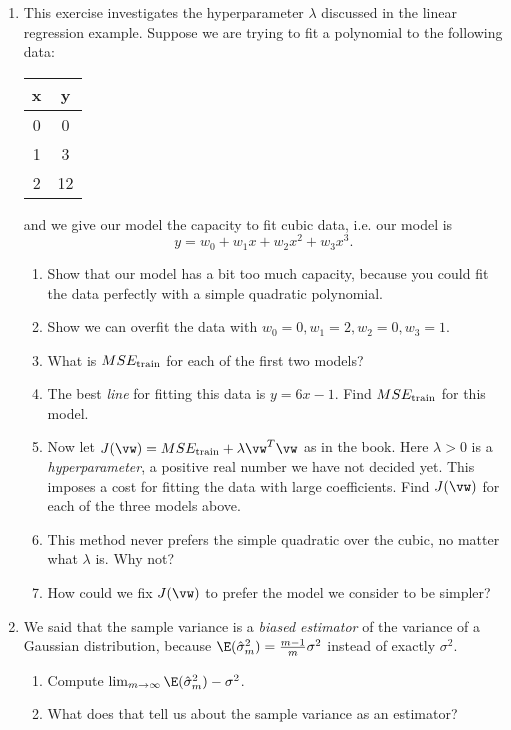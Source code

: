 \documentclass{article}
\newcommand{\strain}{_{\textnormal{train}}}
\begin{document}
\begin{enumerate}
\item This exercise investigates the hyperparameter $\lambda$ discussed in the linear regression example. Suppose we are trying to fit a polynomial to the following data:

    \begin{tabular}{c|c}
    x & y \\
    \hline
    0 & 0 \\
    1 & 3 \\
    2 & 12
    \end{tabular}

and we give our model the capacity to fit cubic data, i.e. our model is
\begin{equation*} y = w_0 + w_1 x + w_2 x^2 + w_3 x^3. \end{equation*}

\begin{enumerate}
    \item Show that our model has a bit too much capacity, because you could fit the data perfectly with a simple quadratic polynomial.
    \item Show we can overfit the data with $w_0 = 0, w_1 = 2, w_2 = 0, w_3 = 1$.
    \item What is $MSE\strain$ for each of the first two models?
    \item The best \emph{line} for fitting this data is $y = 6x - 1$. Find $MSE\strain$ for this model. 
    \item Now let $J(\vw) = MSE\strain + \lambda \vw^T\vw$ as in the book. Here $\lambda > 0$ is a \emph{hyperparameter}, a positive real number we have not decided yet. This imposes a cost for fitting the data with large coefficients. Find $J(\vw)$ for each of the three models above.
    \item This method never prefers the simple quadratic over the cubic, no matter what $\lambda$ is. Why not? 
    \item How could we fix $J(\vw)$ to prefer the model we consider to be simpler?
    \end{enumerate}
\item We said that the sample variance is a \emph{biased estimator} of the variance of a Gaussian distribution, because $\E(\hat{\sigma}_m^2) = \frac{m-1}{m}\sigma^2$ instead of exactly $\sigma^2$.
    \begin{enumerate}
        \item Compute $\lim_{m\to\infty} \E(\hat{\sigma}_m^2) - \sigma^2$.
        \item What does that tell us about the sample variance as an estimator?

\end{enumerate}
\end{enumerate}
\end{document}
